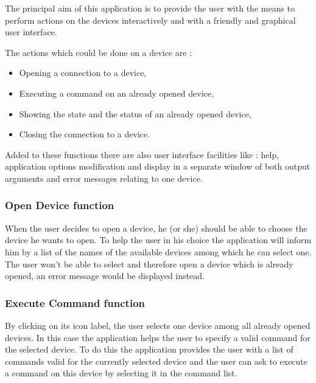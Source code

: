 %
%
%
%
%
%
%
%
%
%
The principal aim of this application is to provide the user with the means to
perform actions on the devices interactively and with a friendly and graphical
user interface.

The actions which could be done on a device are :
\begin{itemize}
\item
Opening a connection to a device,
\item
Executing a command on an already opened device,
\item
Showing the state and the status of an already opened device,
\item
Closing the connection to a device.
\end{itemize}

Added to these functions there are also user interface facilities like : help, 
application options modification and display in a separate window of both 
output arguments and error messages relating to one device.

\subsubsection{Open Device function}

When the user decides to open a device, he (or she) should be able to choose
the device he wants to open. To help the user in his choice the application
will inform him by a list of the names of the available devices among which he
can select one. The user won't be able to select and therefore open a device
which is already opened, an error message would be displayed instead.

\subsubsection{Execute Command function}

By clicking on its icon label, the user selects one device among all already
opened devices. In this case the application helps the user to specify a  
valid command for the selected device. To do this the application
provides the user with a list of commands valid for the currently selected
device and the user can ask to execute a command on this device by selecting it
in the command list.

